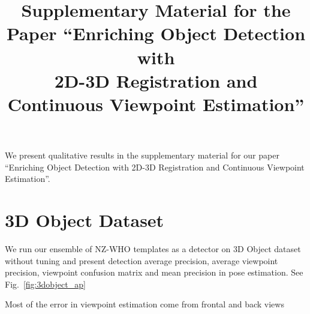 \documentclass[10pt,twocolumn,letterpaper]{article}
\begin{document}
\title{Supplementary Material for the Paper ``Enriching Object Detection with\\2D-3D Registration and Continuous Viewpoint Estimation''}


\maketitle

We present qualitative results in the supplementary material for our paper
``Enriching Object Detection with 2D-3D Registration and Continuous Viewpoint
Estimation''.

\section{3D Object Dataset}
\label{sect:3dobject}
We run our ensemble of NZ-WHO templates as a detector on 3D Object
dataset\cite{savarese07} without tuning and present detection average precision, average
viewpoint precision, viewpoint confusion matrix and mean precision in pose
estimation. See Fig.~\ref{fig:3dobject_ap}

Most of the error in viewpoint estimation come from frontal and back views
\end{document}
